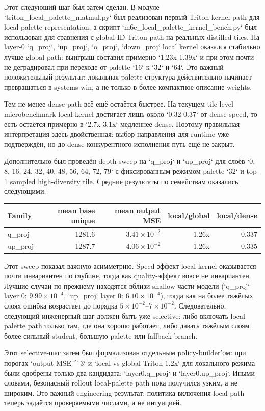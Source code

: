 Этот следующий шаг был затем сделан. В модуле `triton_local_palette_matmul.py`
был реализован первый Triton kernel-path для local palette representation, а
скрипт `m6e_local_palette_kernel_bench.py` был использован для сравнения с
global-ID Triton path на реальных distilled tiles. На layer-0 `q_proj`,
`up_proj`, `o_proj`, `down_proj` local kernel оказался стабильно лучше global
path: выигрыш составил примерно `1.23x-1.39x` и при этом почти не деградировал
при переходе от palette `16` к `32` и `64`. Это важный положительный результат:
локальная palette структура действительно начинает превращаться в systems-win,
а не только в более компактное описание weights.

Тем не менее dense path всё ещё остаётся быстрее. На текущем tile-level
microbenchmark local kernel достигает лишь около `0.32-0.37` от dense speed,
то есть остаётся примерно в `2.7x-3.1x` медленнее dense. Поэтому правильная
интерпретация здесь двойственная: выбор направления для runtime уже подтверждён,
но до dense-конкурентного исполнения путь ещё не закрыт.

Дополнительно был проведён depth-sweep на `q_proj` и `up_proj` для слоёв
`0, 8, 16, 24, 32, 40, 48, 56, 64, 72, 79` с фиксированным режимом palette
`32` и top-1 sampled high-diversity tile. Средние результаты по семействам
оказались следующими:

\begin{center}
\begin{tabular}{lrrrr}
\toprule
Family & mean base unique & mean output MSE & local/global & local/dense \\
\midrule
q\_proj & 1281.6 & $3.41 \times 10^{-2}$ & 1.26x & 0.337 \\
up\_proj & 1287.7 & $4.06 \times 10^{-2}$ & 1.26x & 0.335 \\
\bottomrule
\end{tabular}
\end{center}

Этот sweep показал важную асимметрию. Speed-эффект local kernel оказывается
почти инвариантен по глубине, тогда как quality-эффект вовсе не инвариантен.
Лучшие случаи по-прежнему находятся вблизи shallow части модели (`q_proj`
layer 0: $9.99 \times 10^{-4}$, `up_proj` layer 0: $6.10 \times 10^{-4}$),
тогда как на более тяжёлых слоях ошибка возрастает до порядка
$5 \times 10^{-2}$--$7 \times 10^{-2}$. Следовательно, следующий инженерный
шаг должен быть уже selective: либо включать local palette path только там,
где она хорошо работает, либо давать тяжёлым слоям более сильный student,
большую palette или fallback branch.

Этот selective-шаг затем был формализован отдельным policy-builder'ом:
при порогах `output MSE ^{-3}` и `local-vs-global Triton \ge 1.2x`
для локального режима были одобрены только два кандидата: `layer0.q_proj`
и `layer0.up_proj`. Иными словами, безопасный rollout local-palette path пока
получился узким, а не широким. Это важный engineering-результат: политика
включения local path теперь задаётся проверяемыми числами, а не интуицией.